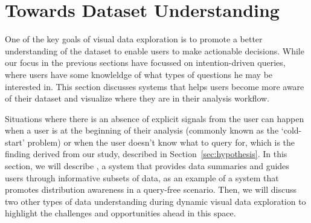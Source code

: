 \section{Towards Dataset Understanding\label{sec:understanding}}
\par One of the key goals of visual data exploration is to promote a better understanding of the dataset to enable users to make actionable decisions. While our focus in the previous sections have focussed on intention-driven queries, where users have some knowleldge of what types of questions he may be interested in. This section discusses systems that helps users become more aware of their dataset and visualize where they are in their analysis workflow. %
\par Situations where there is an absence of explicit signals from the user can happen when a user is at the beginning of their analysis (commonly known as the `cold-start' problem) or when the user doesn't know what to query for, which is the finding derived from our \zv study, described in Section~\ref{sec:hypothesis}. In this section, we will describe \sbd, a system that provides data summaries and guides users through informative subsets of data, as an example of a system that promotes distribution awareness in a query-free scenario. Then, we will discuss two other types of data understanding during dynamic visual data exploration to highlight the challenges and opportunities ahead in this space.
